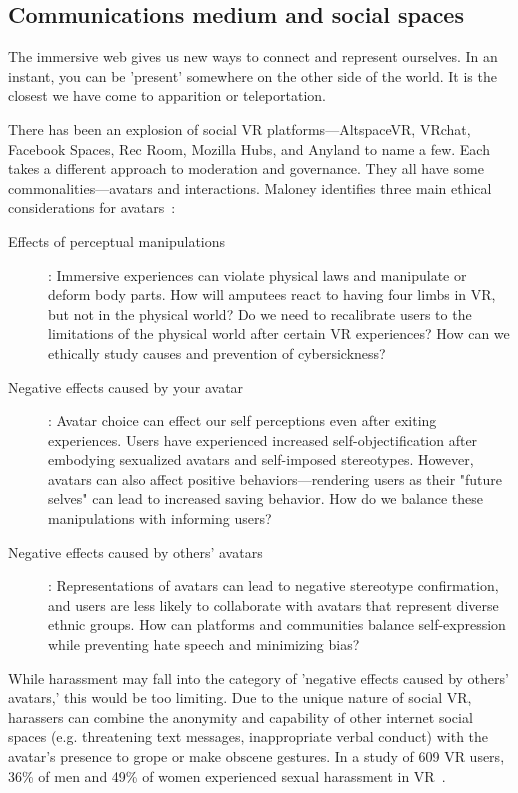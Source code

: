 \subsection{Communications medium and social spaces} \label{subsec:communications}
The immersive web gives us new ways to connect and represent ourselves. In an instant, you can be 'present' somewhere on the other side of the world. It is the closest we have come to apparition or teleportation.

There has been an explosion of social VR platforms---AltspaceVR, VRchat, Facebook Spaces, Rec Room, Mozilla Hubs, and Anyland to name a few. Each takes a different approach to moderation and governance. They all have some commonalities---avatars and interactions. Maloney identifies three main ethical considerations for avatars~\cite{maloney}:
\begin{description}
	\item[ Effects of perceptual manipulations]: Immersive experiences can violate physical laws and manipulate or deform body parts. How will amputees react to having four limbs in VR, but not in the physical world? Do we need to recalibrate users to the limitations of the physical world after certain VR experiences? How can we ethically study causes and prevention of cybersickness?
	\item [Negative effects caused by your avatar]: Avatar choice can effect our self perceptions even after exiting experiences. Users have experienced increased self-objectification after embodying sexualized avatars and self-imposed stereotypes. However, avatars can also affect positive behaviors---rendering users as their "future selves" can lead to increased saving behavior. How do we balance these manipulations with informing users?
	\item [Negative effects caused by others' avatars]: Representations of avatars can lead to negative stereotype confirmation, and users are less likely to collaborate with avatars that represent diverse ethnic groups. How can platforms and communities balance self-expression while preventing hate speech and minimizing bias?
\end{description}

While harassment may fall into the category of 'negative effects caused by others' avatars,' this would be too limiting. Due to the unique nature of social VR, harassers can combine the anonymity and capability of other internet social spaces (e.g. threatening text messages, inappropriate verbal conduct) with the avatar's presence to grope or make obscene gestures. In a study of 609 VR users, 36\% of men and 49\% of women experienced sexual harassment in VR~\cite{outlaw2018}.

